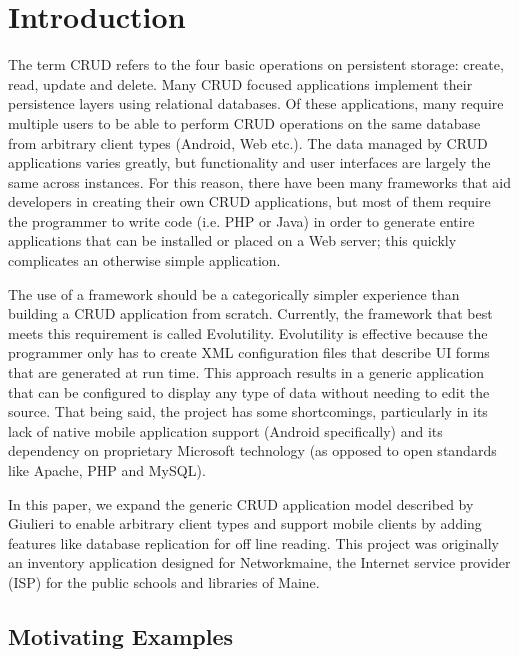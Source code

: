 \section{Introduction} \label{sec:intro}


The term CRUD refers to the four basic operations on persistent storage: create,
read, update and delete. Many CRUD focused applications implement their
persistence layers using relational databases. Of these applications, many
require multiple users to be able to perform CRUD operations on the same
database from arbitrary client types (Android, Web
etc.). The data managed by CRUD applications varies greatly, but functionality
and user interfaces are largely the same across instances. For this reason,
there have been many frameworks that aid developers in creating their own CRUD
applications, but most of them require the programmer to write code (i.e. PHP or
Java) in order to generate entire applications that can be installed or placed
on a Web server; this quickly complicates an otherwise simple application. 

The use of a framework should be a categorically simpler experience than
building a CRUD application from scratch. Currently, the framework that best
meets this requirement is called Evolutility. Evolutility
is effective because the programmer only has to create XML configuration files
that describe UI forms that are generated at run time. This approach results in
a generic application that can be configured to display any type of data without
needing to edit the source. That being said, the project has some shortcomings,
particularly in its lack of native mobile application support (Android
specifically) and its dependency on proprietary Microsoft technology (as opposed
to open standards like Apache, PHP and MySQL). 

In this paper, we expand the generic CRUD application model described by
Giulieri to enable arbitrary client types and support mobile clients by adding
features like database replication for off line
reading\cite{giulieri_minimalist_2011}. This project was originally an inventory
application designed for Networkmaine, the Internet service provider (ISP) for
the public schools and libraries of Maine.


\subsection{Motivating Examples} \label{sec:motivation}

